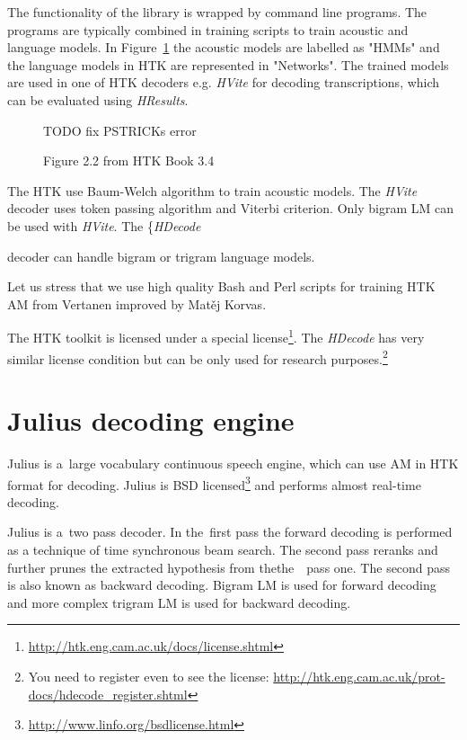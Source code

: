 {The functionality of the library is wrapped by command line programs.
The programs are typically combined in training scripts to train acoustic and language models.
In Figure~\ref{fig:htk_tools} the acoustic models are labelled as "HMMs" 
and the language models in \ac{HTK} are represented in "Networks".
The trained models are used in one of \ac{HTK} decoders e.g. {\it HVite}\/ for decoding
transcriptions, which can be evaluated using {\it HResults}.

\begin{figure}[!htp]
    \begin{center}
    TODO fix PSTRICKs error
    \caption{Figure 2.2 from HTK Book 3.4\cite{young2006htk}}
    \label{fig:htk_tools} 
    \end{center}
\end{figure}

The \ac{HTK} use Baum-Welch algorithm to train acoustic models.
The {\it HVite} decoder uses token passing algorithm and Viterbi criterion.
\cite{HTKBook3.4} %
Only bigram \ac{LM} can be used with {\it HVite}.
The \{\it HDecode} decoder can handle bigram or trigram language models. 


Let us stress that we use high quality Bash and Perl scripts for training \ac{HTK} \ac{AM}
from Vertanen improved by Matěj Korvas.\cite{vertanen_baseline_2006}\cite{korvas_2014}

The \ac{HTK} toolkit is licensed under a special license\footnote{\url{http://htk.eng.cam.ac.uk/docs/license.shtml}}.
The {\it HDecode} has very similar license condition but can be only used for research purposes.\footnote{You
need to register even to see the license: \url{http://htk.eng.cam.ac.uk/prot-docs/hdecode_register.shtml}}

\section{Julius decoding engine}
\label{sec:back_julius}

Julius is a~large vocabulary continuous speech engine, which can use \ac{AM} in \ac{HTK} format for decoding.\cite{lee2009julius}
Julius is BSD licensed\footnote{\url{http://www.linfo.org/bsdlicense.html}} and performs almost real-time decoding.

Julius is a~two pass decoder. In the~first pass the forward decoding is performed as
a technique of time synchronous beam search.
The second pass reranks and further prunes the extracted hypothesis from thethe~~pass one.
The second pass is also known as backward decoding.
Bigram \ac{LM} is used for forward decoding and more complex trigram \ac{LM} is used for backward decoding.

